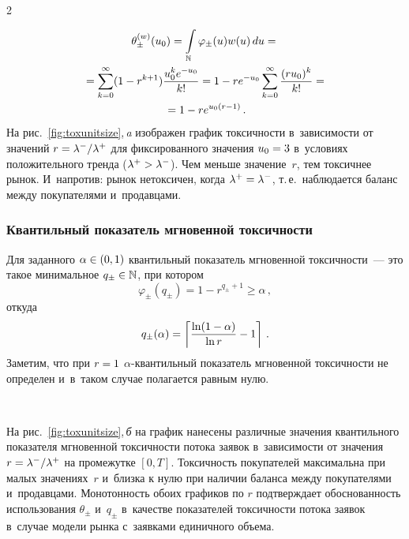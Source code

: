 \begin{multicols}{2}
\vspace*{9pt}


\addtocounter{figure}{1}



\noindent
\begin{multline*}
\theta_{\pm}^{(w)}(u_0) = \int\limits_{\mathbb{N}} \varphi_{\pm}(u) w(u)\, du ={}\\
{}= \sum\limits_{k=0}^{\infty} (1 - r^{k + 1}) \displaystyle\frac{\displaystyle u_0^k e^{-u_0}\mathstrut}{\displaystyle k!\mathstrut} =
1 - r e^{-u_0} \sum\limits_{k=0}^{\infty} \displaystyle\frac{\displaystyle (ru_0)^k\mathstrut}{\displaystyle k!\mathstrut} = {}\\
{}=1 - r e^{u_0(r - 1)}\,.
\end{multline*}
На рис.~\ref{fig:toxunitsize},\,\textit{a} изображен
график токсичности в~зависимости от значений $r \hm= {\lambda^-}/{\lambda^+}$ для
фиксированного значения $u_0 \hm= 3$ в~условиях положительного тренда
($\lambda^+ \hm> \lambda^-$). Чем меньше значение~$r$, тем токсичнее
рынок. И~напротив: рынок нетоксичен, когда $\lambda^+ \hm= \lambda^-$,
т.\,е.\ наблюдается баланс между покупателями и~продавцами.

\subsubsection{Квантильный показатель мгновенной токсичности}

Для заданного $\alpha \hm\in (0, 1)$ квантильный показатель мгновенной
токсичности~--- это такое минимальное $q_{\pm}\hm \in \mathbb{N}$, при котором
$$
\varphi_{\pm}(q_{\pm}) = 1 - r^{q_{\pm} + 1} \geqslant \alpha\,,
$$
откуда
$$
q_{\pm}(\alpha) = \left \lceil \displaystyle\frac{\displaystyle \ln(1 - \alpha)\mathstrut}{\displaystyle \ln r\mathstrut} - 1 \right \rceil\,.
$$
Заметим, что при $r \hm= 1$ $\alpha$-кван\-тиль\-ный показатель мгновенной
токсичности не определен и~в~таком случае полагается равным нулю.

\begin{figure*} %
\vspace*{1pt}
 \begin{center}
 \mbox{%
 \epsfxsize=160.51mm
 }
 \end{center}
 \vspace*{-9pt}
    \label{fig:toxunitsize}
\end{figure*}

На рис.~\ref{fig:toxunitsize},\,\textit{б} на график нанесены различные значения
квантильного показателя мгновенной токсичности потока заявок в~зависимости от
значения $r \hm= {\lambda^-}/{\lambda^+}$ на
промежутке $[0, T]$. Токсичность покупателей максимальна при малых
значениях~$r$ и~близка к нулю при наличии баланса между покупателями
и~продавцами.
Монотонность обоих графиков по $r$ подтверждает обоснованность
использования $\theta_{\pm}$ и~$q_{\pm}$ в~качестве показателей
токсичности потока заявок в~случае модели рынка с~заявками
единичного объема.


\end{multicols}
